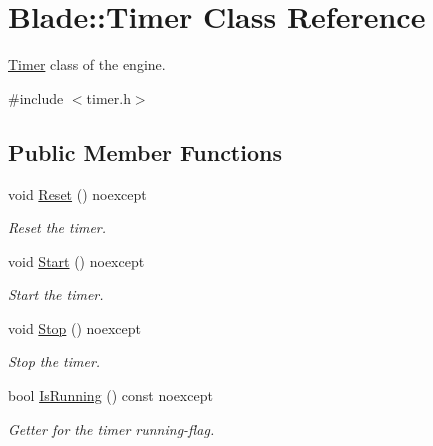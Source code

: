 \hypertarget{class_blade_1_1_timer}{}\section{Blade\+:\+:Timer Class Reference}
\label{class_blade_1_1_timer}


\hyperlink{class_blade_1_1_timer}{Timer} class of the engine.  




{\ttfamily \#include $<$timer.\+h$>$}

\subsection*{Public Member Functions}
\begin{DoxyCompactItemize}
\item 
\mbox{\label{class_blade_1_1_timer_a8f8bdd37bd6c4c6fe0badc8b3de5151c}} 
void \hyperlink{class_blade_1_1_timer_a8f8bdd37bd6c4c6fe0badc8b3de5151c}{Reset} () noexcept
\begin{DoxyCompactList}\small\item\em Reset the timer. \end{DoxyCompactList}\item 
\mbox{\label{class_blade_1_1_timer_aaca827063f16e238be127ad0cc8b022c}} 
void \hyperlink{class_blade_1_1_timer_aaca827063f16e238be127ad0cc8b022c}{Start} () noexcept
\begin{DoxyCompactList}\small\item\em Start the timer. \end{DoxyCompactList}\item 
\mbox{\label{class_blade_1_1_timer_a9049289e8c49255bd46e5d070e8f92e0}} 
void \hyperlink{class_blade_1_1_timer_a9049289e8c49255bd46e5d070e8f92e0}{Stop} () noexcept
\begin{DoxyCompactList}\small\item\em Stop the timer. \end{DoxyCompactList}\item 
bool \hyperlink{class_blade_1_1_timer_ae5e5bf6cdb995dbeb15cb94d87026809}{Is\+Running} () const noexcept
\begin{DoxyCompactList}\small\item\em Getter for the timer running-\/flag. \end{DoxyCompactList}\item 

\end{DoxyCompactItemize}
